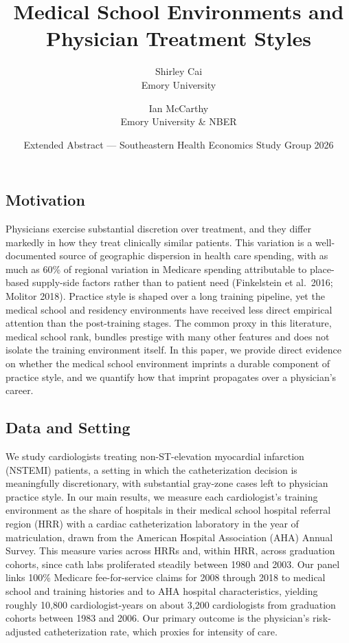 \documentclass[11pt]{article}
\title{Medical School Environments and Physician Treatment Styles}
\author{Shirley Cai\\[0.2em]Emory University \and Ian McCarthy\\[0.2em]Emory University \& NBER}
\date{\vspace{-0.6em}\normalsize Extended Abstract --- Southeastern Health Economics Study Group 2026}
\begin{document}
\maketitle
\thispagestyle{empty}
\vspace{-1.5em}

\subsection*{Motivation}

\noindent Physicians exercise substantial discretion over treatment, and they differ markedly in how they treat clinically similar patients. This variation is a well-documented source of geographic dispersion in health care spending, with as much as 60\% of regional variation in Medicare spending attributable to place-based supply-side factors rather than to patient need (Finkelstein et al.\ 2016; Molitor 2018). Practice style is shaped over a long training pipeline, yet the medical school and residency environments have received less direct empirical attention than the post-training stages. The common proxy in this literature, medical school rank, bundles prestige with many other features and does not isolate the training environment itself. In this paper, we provide direct evidence on whether the medical school environment imprints a durable component of practice style, and we quantify how that imprint propagates over a physician's career.

\subsection*{Data and Setting}

We study cardiologists treating non-ST-elevation myocardial infarction (NSTEMI) patients, a setting in which the catheterization decision is meaningfully discretionary, with substantial gray-zone cases left to physician practice style. In our main results, we measure each cardiologist's training environment as the share of hospitals in their medical school hospital referral region (HRR) with a cardiac catheterization laboratory in the year of matriculation, drawn from the American Hospital Association (AHA) Annual Survey. This measure varies across HRRs and, within HRR, across graduation cohorts, since cath labs proliferated steadily between 1980 and 2003. Our panel links 100\% Medicare fee-for-service claims for 2008 through 2018 to medical school and training histories and to AHA hospital characteristics, yielding roughly 10,800 cardiologist-years on about 3,200 cardiologists from graduation cohorts between 1983 and 2006. Our primary outcome is the physician's risk-adjusted catheterization rate, which proxies for intensity of care.
\end{document}
